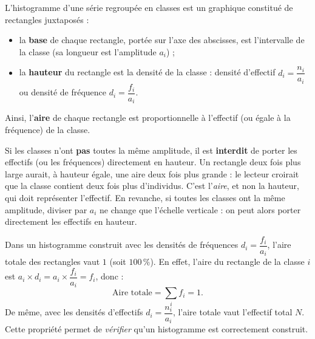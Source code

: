 \documentclass[11pt]{article}
\newcommand{\cle}[1]{{\popxbold\color{popdark}#1}}
\begin{document}
\begin{definition}
L'\cle{histogramme} d'une série regroupée en classes est un graphique constitué de rectangles juxtaposés :
\begin{itemize}
\item la \textbf{base} de chaque rectangle, portée sur l'axe des abscisses, est l'intervalle de la classe (sa longueur est l'\cle{amplitude} $a_i$) ;
\item la \textbf{hauteur} du rectangle est la \cle{densité} de la classe : densité d'effectif $d_i = \dfrac{n_i}{a_i}$ ou densité de fréquence $d_i = \dfrac{f_i}{a_i}$.
\end{itemize}
Ainsi, l'\textbf{aire} de chaque rectangle est proportionnelle à l'effectif (ou égale à la fréquence) de la classe.
\end{definition}

\begin{attention}
Si les classes n'ont \textbf{pas} toutes la même amplitude, il est \textbf{interdit} de porter les effectifs (ou les fréquences) directement en hauteur. Un rectangle deux fois plus large aurait, à hauteur égale, une aire deux fois plus grande : le lecteur croirait que la classe contient deux fois plus d'individus. C'est l'\emph{aire}, et non la hauteur, qui doit représenter l'effectif. En revanche, si toutes les classes ont la même amplitude, diviser par $a_i$ ne change que l'échelle verticale : on peut alors porter directement les effectifs en hauteur.
\end{attention}

\begin{propriete}
Dans un histogramme construit avec les densités de fréquences $d_i = \dfrac{f_i}{a_i}$, l'aire totale des rectangles vaut $1$ (soit $100\,\%$). En effet, l'aire du rectangle de la classe $i$ est $a_i \times d_i = a_i \times \dfrac{f_i}{a_i} = f_i$, donc :
\[ \text{Aire totale} = \sum_{i} f_i = 1. \]
De même, avec les densités d'effectifs $d_i = \dfrac{n_i}{a_i}$, l'aire totale vaut l'effectif total $N$. Cette propriété permet de \emph{vérifier} qu'un histogramme est correctement construit.
\end{propriete}
\end{document}
